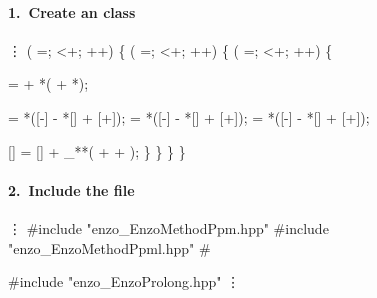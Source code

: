 
\begin{frame}[fragile] 
\secframetitle{\ssDevelMethod}
\framesubtitle{1.~Create an  class}
\begin{semiverbatim}\scriptsize
        \vdots
    ( =; <+; ++) \{
       ( =; <+; ++) \{
          ( =; <+; ++) \{

              =  + *( + *);

              = *([-] - *[] + [+]);
              = *([-] - *[] + [+]);
              = *([-] - *[] + [+]);

            [] = [] + _**( +  + );
         \}
      \}
   \}
\}
\end{semiverbatim}
\end{frame}


\begin{frame}[fragile] 
\secframetitle{\ssDevelMethod}
\framesubtitle{2.~Include the  file}
%
\begin{semiverbatim}
       \vdots
   #include "enzo_EnzoMethodPpm.hpp"
   #include "enzo_EnzoMethodPpml.hpp"
   # 

   #include "enzo_EnzoProlong.hpp"
       \vdots
\end{semiverbatim}


\end{frame}

